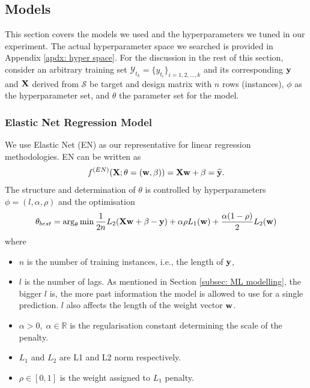 \subsection{Models}\label{subsec: models}
This section covers the models we used and the hyperparameters we tuned in our experiment. The actual hyperparameter space we searched is provided in Appendix \ref{apdx: hyper space}. For the discussion in the rest of this section, consider an arbitrary training set $\mathcal{Y}_{t_k} = \{y_{t_i} \}_{i = 1, 2, \ldots, k}$ and its corresponding $\mathbf{y}$ and $\mathbf{X}$ derived from $\mathcal{S}$ be target and design matrix with $n$ rows (instances), $\phi$ as the hyperparameter set, and $\theta$ the parameter set for the model.

\subsubsection{Elastic Net Regression Model}
We use Elastic Net (EN) as our representative for linear regression methodologies. EN can be written as
\begin{gather*}
    f^{(EN)} (\mathbf{X} ; \theta = (\mathbf{w}, \mathbf{\beta})) = \mathbf{X} \mathbf{w} + \mathbf{\beta} = \widehat{\mathbf{y}}.
\end{gather*}
The structure and determination of $\theta$ is controlled by hyperparameters $\phi = (l, \alpha, \rho)$ and the optimisation
\begin{equation*}
    \theta_{best} = \arg_{\theta} \min \frac{1}{2n} L_2(\mathbf{X} \mathbf{w} + \mathbf{\beta} - \mathbf{y}) + \alpha \rho L_1(\mathbf{w}) + \frac{\alpha (1 - \rho)}{2} L_2(\mathbf{w})
\end{equation*}
where
\begin{itemize}
    \item $n$ is the number of training instances, i.e., the length of $\mathbf{y}$,
    \item $l$ is the number of lags. As mentioned in Section \ref{subsec: ML modelling}, the bigger $l$ is, the more past information the model is allowed to use for a single prediction. $l$ also affects the length of the weight vector $\mathbf{w}$.
    \item $\alpha > 0, \; \alpha \in \mathbb{R}$ is the regularisation constant determining the scale of the penalty.
    \item $L_1$ and $L_2$ are L1 and L2 norm respectively.
    \item $\rho \in [0, 1]$ is the weight assigned to $L_1$ penalty.
\end{itemize}

